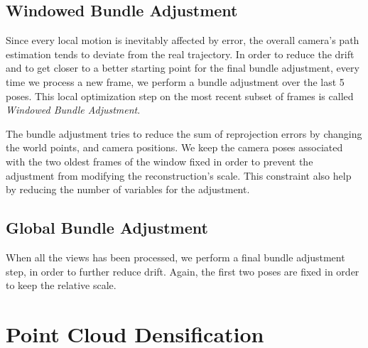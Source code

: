 \subsection{Windowed Bundle Adjustment}
Since every local motion is inevitably affected by error, the overall 
camera's path estimation tends to deviate from the real trajectory.
In order to reduce the drift and to get closer to a better starting point 
for the final bundle adjustment, every time we process a new frame, 
we perform a bundle adjustment over the last 5 poses.
This local optimization step on the most recent subset of frames is called
\textit{Windowed Bundle Adjustment}.

The bundle adjustment tries to reduce the sum of reprojection errors by changing the
world points, and camera positions. 
We keep the camera poses associated with the two oldest frames of the window 
fixed in order to prevent the adjustment from modifying the reconstruction's 
scale. This constraint also help by reducing the number of variables for the 
adjustment.

\subsection{Global Bundle Adjustment}
When all the views has been processed, we perform a final bundle adjustment 
step, in order to further reduce drift. Again, the first two poses are fixed in 
order to keep the relative scale.

\section{Point Cloud Densification}
\label{sec:pipeline_densification}
